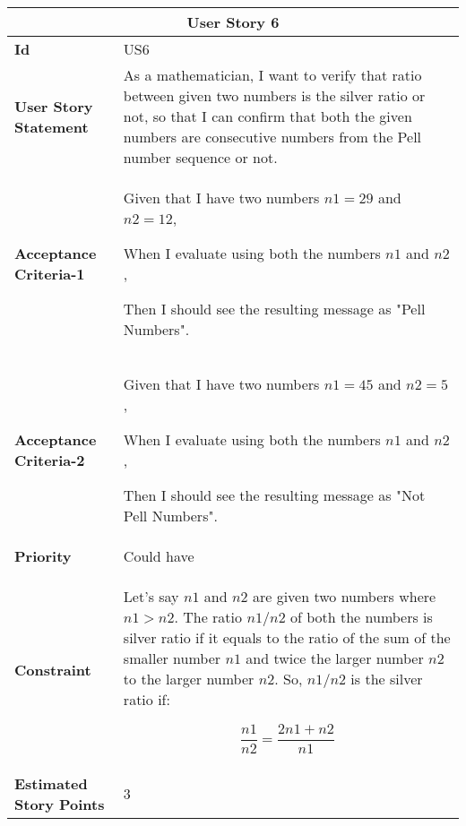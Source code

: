 \hspace{1cm}
\begin{center}
\begin{tabular}{ | m{2.3cm} | m{12cm} | } 

 \hline
 \multicolumn{2}{|c|}{\textbf{User Story 6}} \\

\hline
\textbf{Id} & US6 \\ 

\hline
\textbf{User Story Statement} & As a mathematician, I want to verify that
ratio between given two numbers is the silver ratio or not, so that I can confirm that both the given numbers are consecutive numbers from the Pell number sequence or not.\\ 

\hline
\textbf{Acceptance Criteria-1} & Given that I have two numbers $n1=29$ and $n2=12$,

When I evaluate using both the numbers $n1$ and $n2$,

Then I should see the resulting message as "Pell Numbers". \\ 

\hline
\textbf{Acceptance Criteria-2} & Given that I have two numbers $n1=45$ and $n2=5$,

When I evaluate using both the numbers $n1$ and $n2$,

Then I should see the resulting message as "Not Pell Numbers". \\

\hline
\textbf{Priority} & Could have \\ 

\hline
\textbf{Constraint} & Let's say $n1$ and $n2$ are given two numbers where $ n1 > n2 $. The ratio $n1/n2$ of both the numbers is silver ratio if it equals to the ratio of the sum of the smaller number $n1$ and twice the larger number $n2$ to the larger number $n2$. So, $n1/n2$ is the silver ratio if:

\[\frac{n1}{n2}=\frac{2n1 + n2}{n1} \] \\ 

\hline
\textbf{Estimated Story Points} & 3 \\ 
\hline

\end{tabular}
\end{center}
